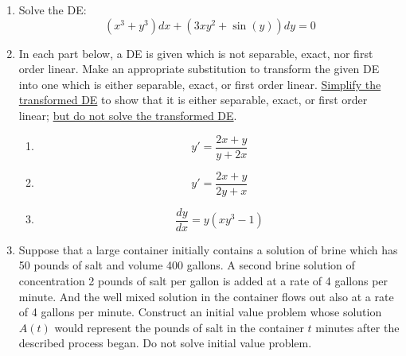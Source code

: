 \documentclass[12pt]{report}
\begin{document}
\begin{enumerate}[label=\arabic*.]
	\item Solve the DE: \[ (x^{3} + y^{3})dx + (3xy^{2} + \sin(y))dy = 0 \]
	\item In each part below, a DE is given which is not separable, exact, nor first order linear. Make an appropriate substitution to transform the given DE into one which is either separable, exact, or first order linear. \underline{Simplify the transformed DE} to show that it is either separable, exact, or first order linear; \underline{but do not solve the transformed DE}.
	\begin{enumerate}[label=(\roman*)]
	    \item \[ y' = \frac{2x + y}{y + 2x} \]
	    \item \[ y' = \frac{2x + y}{2y + x} \]
		\item \[ \frac{dy}{dx} = y(xy^{3} - 1) \]
	\end{enumerate}
	\item Suppose that a large container initially contains a solution of brine which has 50 pounds of salt and volume 400 gallons. A second brine solution of concentration 2 pounds of salt per gallon is added at a rate of 4 gallons per minute. And the well mixed solution in the container flows out also at a rate of 4 gallons per minute. Construct an initial value problem whose solution $A(t)$ would represent the pounds of salt in the container $t$ minutes after the described process began. Do not solve initial value problem.
\end{enumerate}
\end{document}
